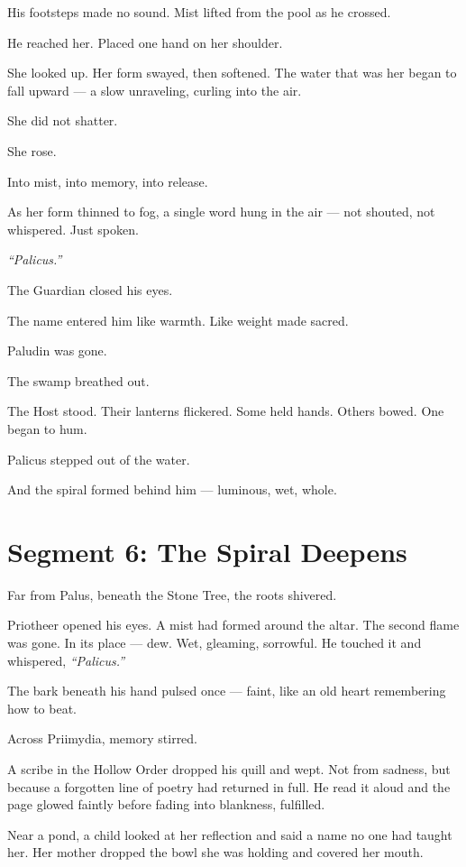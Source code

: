 \documentclass[9pt]{article}
\begin{document}
His footsteps made no sound. Mist lifted from the pool as he crossed.

He reached her. Placed one hand on her shoulder.

She looked up. Her form swayed, then softened. The water that was her began to fall upward — a slow unraveling, curling into the air.

She did not shatter.

She rose.

Into mist, into memory, into release.

As her form thinned to fog, a single word hung in the air — not shouted, not whispered. Just spoken.

\textit{``Palicus.''}

The Guardian closed his eyes.

The name entered him like warmth. Like weight made sacred.

Paludin was gone.

The swamp breathed out.

The Host stood. Their lanterns flickered. Some held hands. Others bowed. One began to hum.

Palicus stepped out of the water.

And the spiral formed behind him — luminous, wet, whole.

\newpage

\section*{Segment 6: The Spiral Deepens}

Far from Palus, beneath the Stone Tree, the roots shivered.

Priotheer opened his eyes. A mist had formed around the altar. The second flame was gone. In its place — dew. Wet, gleaming, sorrowful. He touched it and whispered, \textit{``Palicus.''}

The bark beneath his hand pulsed once — faint, like an old heart remembering how to beat.

Across Priimydia, memory stirred.

A scribe in the Hollow Order dropped his quill and wept. Not from sadness, but because a forgotten line of poetry had returned in full. He read it aloud and the page glowed faintly before fading into blankness, fulfilled.

Near a pond, a child looked at her reflection and said a name no one had taught her. Her mother dropped the bowl she was holding and covered her mouth.
\end{document}
